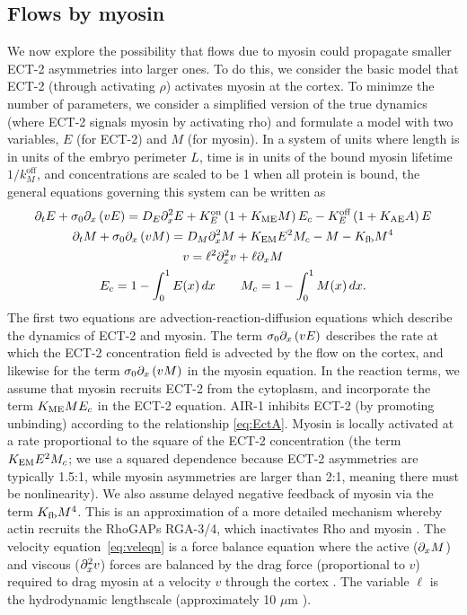 \documentclass[11pt]{article}
\newcommand{\red}[1]{\color{red}#1\normalcolor}
\begin{document}
\subsection{Flows by myosin}
We now explore the possibility that flows due to myosin could propagate smaller ECT-2 asymmetries into larger ones. To do this, we consider the basic model that ECT-2 (through activating $\rho$) activates myosin at the cortex. To minimze the number of parameters, we consider a simplified version of the true dynamics (where ECT-2 signals myosin by activating rho) and formulate a model with two variables, $E$ (for ECT-2) and $M$ (for myosin). In a system of units where length is in units of the embryo perimeter $L$, time is in units of the bound myosin lifetime $1/k^\text{off}_M$, and concentrations are scaled to be 1 when all protein is bound, the general equations governing this system can be written as
\begin{subequations}
\label{eq:MySimple}
\begin{gather}
\partial_t E + \sigma_0 \partial_x \left( v E\right) = D_E \partial_x^2 E +K^\text{on}_E \left(1+K_\text{ME} M\right)E_c - K^\text{off}_E  \left(1+K_\text{AE} A\right)E \\
\label{eq:MyEq}
\partial_t M + \sigma_0 \partial_x \left( v M \right) = D_M \partial_x^2 M +K_\text{EM} E ^2M_c - M -K_\text{fb} M^4 \\
\label{eq:veleqn}
v = \ell^2 \partial_x^2 v +\ell \partial_x M \\
E_c = 1-\int_0^1 E(x) \, dx \qquad M_c = 1-\int_0^1 M(x) \, dx.
\end{gather} 
\end{subequations}
The first two equations are advection-reaction-diffusion equations which describe the dynamics of ECT-2 and myosin. The term $\sigma_0 \partial_x \left(v E\right)$ describes the rate at which the ECT-2 concentration field is advected by the flow on the cortex, and likewise for the term $\sigma_0 \partial_x \left(v M\right)$ in the myosin equation. In the reaction terms, we assume that myosin recruits ECT-2 from the cytoplasm, and incorporate the term $K_\text{ME} M E_c$ in the ECT-2 equation. AIR-1 inhibits ECT-2 (by promoting unbinding) according to the relationship \eqref{eq:EctA}. Myosin is locally activated at a rate proportional to \red{the square of the ECT-2 concentration (the term $K_\text{EM} E^2 M_c$; we use a squared dependence because ECT-2 asymmetries are typically 1.5:1, while myosin asymmetries are larger than 2:1, meaning there must be nonlinearity)}. We also assume delayed negative feedback of myosin via the term $K_\text{fb} M^4$. This is an approximation of a more detailed mechanism whereby actin recruits the RhoGAPs RGA-3/4, which inactivates Rho and myosin \cite{michaux2018excitable, schmutz2007functions, schonegg2007rho}. The velocity equation\ \eqref{eq:veleqn} is a force balance equation where the active ($\partial_x M$) and viscous ($\partial_x^2 v$) forces are balanced by the drag force (proportional to $v$) required to drag myosin at a velocity $v$ through the cortex \cite{bois2011pattern}. The variable $\ell$ is the hydrodynamic lengthscale (approximately 10 $\mu$m \cite{mayer2010anisotropies}). 
\end{document}
